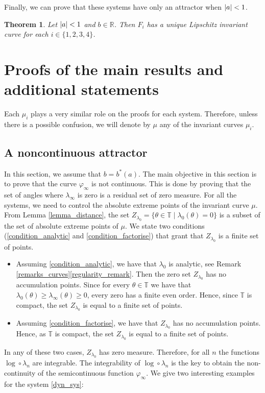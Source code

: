 \documentclass[12pt]{article}
\newcommand{\T}{\mathbb{T}}
\newcommand{\R}{\mathbb{R}}
\theoremstyle{plain}
\newtheorem{thm}[defn]{Theorem}
\theoremstyle{remark}
\DeclarePairedDelimiter\abs{\lvert}{\rvert}
\theoremstyle{definition}
\begin{document}
Finally, we can prove that these systems have only an attractor when $\abs{a}<1$.
\begin{thm}\label{thm_uniform_contraction_case}
    Let $\abs{a}<1$ and $b\in\R$. Then $F_i$ has a unique Lipschitz invariant curve for each $i\in\{1,2,3,4\}$.
\end{thm}

\section{Proofs of the main results and additional statements}\label{proof_sect}
Each $\mu_i$ plays a very similar role on the proofs for each system. Therefore, unless there is a possible confusion, we will denote by $\mu$ any of the invariant curves $\mu_i$.
\subsection{A noncontinuous attractor}\label{section_b*}
In this section, we assume that $b=b^*(a)$.
The main objective in this section is to prove that the curve $\varphi_\infty$ is not continuous. This is done by proving that the set of angles where $\lambda_\infty$ is zero is a residual set of zero measure. For all the systems, we need to control the absolute extreme points of the invariant curve $\mu$. From Lemma \ref{lemma_distance}, the set $Z_{\lambda_0}=\{\theta\in\T\mid\lambda_0(\theta)=0\}$ is a subset of the set of absolute extreme points of $\mu$. We state two conditions (\ref{condition_analytic} and \ref{condition_factorise}) that grant that $Z_{\lambda_0}$ is a finite set of points.
\begin{itemize}
    \item Assuming \ref{condition_analytic}, we have that $\lambda_0$ is analytic, see Remark \ref{remarks_curves}\ref{regularity_remark}. Then the zero set $Z_{\lambda_0}$ has no accumulation points. Since for every $\theta\in\T$ we have that $\lambda_0(\theta)\geq\lambda_\infty(\theta)\geq0$, every zero has a finite even order. Hence, since $\T$ is compact, the set $Z_{\lambda_0}$ is equal to a finite set of points. 

    \item Assuming \ref{condition_factorise}, we have that $Z_{\lambda_0}$ has no accumulation points. Hence, as $\T$ is compact, the set $Z_{\lambda_0}$ is equal to a finite set of points. 
\end{itemize}
In any of these two cases, $Z_{\lambda_0}$ has zero measure. Therefore, for all $n$ the functions $\log\circ\lambda_n$ are integrable. The integrability of $\log\circ\lambda_n$ is the key to obtain the non-continuity of the semicontinuous function $\varphi_\infty$. We give two interesting examples for the system \eqref{dyn_sys}:
\end{document}
